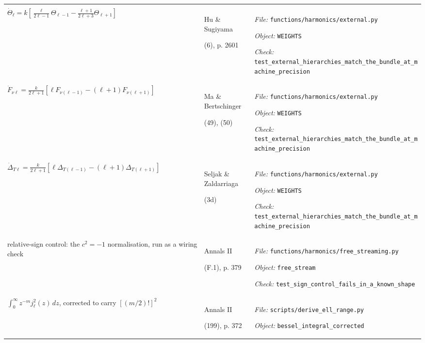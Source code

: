 \begin{landscape}
\begin{longtable}{@{}>{\raggedright\arraybackslash}p{80mm}
                     >{\raggedright\arraybackslash}p{38mm}
                     >{\raggedright\arraybackslash}p{99mm}@{}}
{\textit{Object:} \nolinkurl{analytic_projection}\par
\textit{Check:} \nolinkurl{test_f4_variable_is_exactly_the_spherical_bessel_function}} \\
\addlinespace[2pt]
$\dot\Theta_\ell = k[\frac{\ell}{2\ell-1}\Theta_{\ell-1}-\frac{\ell+1}{2\ell+3}\Theta_{\ell+1}]$ & Hu \& Sugiyama\par (6), p. 2601 & {\scriptsize \textit{File:} \nolinkurl{functions/harmonics/external.py}\par
\textit{Object:} \nolinkurl{WEIGHTS}\par
\textit{Check:} \nolinkurl{test_external_hierarchies_match_the_bundle_at_machine_precision}} \\
\addlinespace[2pt]
$\dot F_{\nu\ell} = \frac{k}{2\ell+1}[\ell F_{\nu(\ell-1)}-(\ell+1)F_{\nu(\ell+1)}]$ & Ma \& Bertschinger\par (49), (50) & {\scriptsize \textit{File:} \nolinkurl{functions/harmonics/external.py}\par
\textit{Object:} \nolinkurl{WEIGHTS}\par
\textit{Check:} \nolinkurl{test_external_hierarchies_match_the_bundle_at_machine_precision}} \\
\addlinespace[2pt]
$\dot\Delta_{T\ell} = \frac{k}{2\ell+1}[\ell\Delta_{T(\ell-1)}-(\ell+1)\Delta_{T(\ell+1)}]$ & Seljak \& Zaldarriaga\par (3d) & {\scriptsize \textit{File:} \nolinkurl{functions/harmonics/external.py}\par
\textit{Object:} \nolinkurl{WEIGHTS}\par
\textit{Check:} \nolinkurl{test_external_hierarchies_match_the_bundle_at_machine_precision}} \\
\addlinespace[2pt]
relative-sign control: the $c^2=-1$ normalisation, run as a wiring check & Annals II\par (F.1), p. 379 & {\scriptsize \textit{File:} \nolinkurl{functions/harmonics/free_streaming.py}\par
\textit{Object:} \nolinkurl{free_stream}\par
\textit{Check:} \nolinkurl{test_sign_control_fails_in_a_known_shape}} \\
\addlinespace[2pt]
$\int_0^\infty z^{-m}j_\ell^2(z)\,dz$, corrected to carry $[(m/2)!]^2$ & Annals II\par (199), p. 372 & {\scriptsize \textit{File:} \nolinkurl{scripts/derive_ell_range.py}\par
\textit{Object:} \nolinkurl{bessel_integral_corrected}\par
}
\end{longtable}
\end{landscape}
